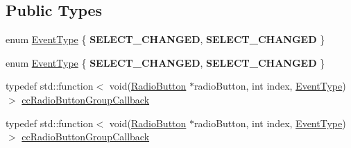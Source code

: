 \subsection*{Public Types}
\begin{DoxyCompactItemize}
\item 
enum \hyperlink{classui_1_1RadioButtonGroup_a41d61680b8001bd43abfccbf49eecef3}{Event\+Type} \{ {\bfseries S\+E\+L\+E\+C\+T\+\_\+\+C\+H\+A\+N\+G\+ED}, 
{\bfseries S\+E\+L\+E\+C\+T\+\_\+\+C\+H\+A\+N\+G\+ED}
 \}
\item 
enum \hyperlink{classui_1_1RadioButtonGroup_a41d61680b8001bd43abfccbf49eecef3}{Event\+Type} \{ {\bfseries S\+E\+L\+E\+C\+T\+\_\+\+C\+H\+A\+N\+G\+ED}, 
{\bfseries S\+E\+L\+E\+C\+T\+\_\+\+C\+H\+A\+N\+G\+ED}
 \}
\item 
typedef std\+::function$<$ void(\hyperlink{classui_1_1RadioButton}{Radio\+Button} $\ast$radio\+Button, int index, \hyperlink{classui_1_1RadioButtonGroup_a41d61680b8001bd43abfccbf49eecef3}{Event\+Type})$>$ \hyperlink{classui_1_1RadioButtonGroup_a8385f08613e843c5977252ed03c37e22}{cc\+Radio\+Button\+Group\+Callback}
\item 
typedef std\+::function$<$ void(\hyperlink{classui_1_1RadioButton}{Radio\+Button} $\ast$radio\+Button, int index, \hyperlink{classui_1_1RadioButtonGroup_a41d61680b8001bd43abfccbf49eecef3}{Event\+Type})$>$ \hyperlink{classui_1_1RadioButtonGroup_a8385f08613e843c5977252ed03c37e22}{cc\+Radio\+Button\+Group\+Callback}
\end{DoxyCompactItemize}

